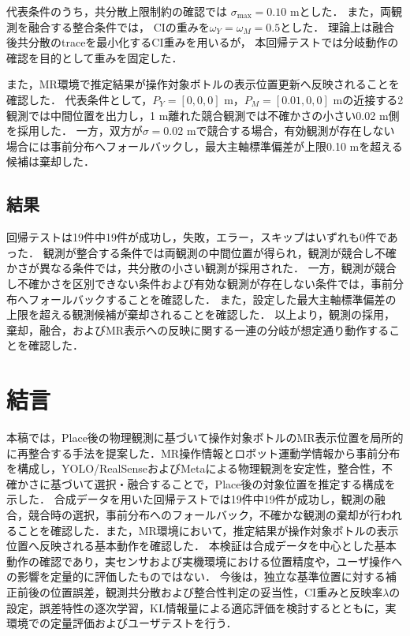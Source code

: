 \documentclass{sice-si}
\begin{document}
代表条件のうち，共分散上限制約の確認では
$\sigma_{\max}=0.10$ mとした．
また，両観測を融合する整合条件では，
CIの重みを$\omega_Y=\omega_M=0.5$とした．
理論上は融合後共分散のtraceを最小化するCI重みを用いるが，
本回帰テストでは分岐動作の確認を目的として重みを固定した．

また，MR環境で推定結果が操作対象ボトルの表示位置更新へ反映されることを確認した．
代表条件として，$P_Y=[0,0,0]$ m，$P_M=[0.01,0,0]$ mの近接する2観測では中間位置を出力し，1 m離れた競合観測では不確かさの小さい0.02 m側を採用した．
一方，双方が$\sigma=0.02$ mで競合する場合，有効観測が存在しない場合には事前分布へフォールバックし，最大主軸標準偏差が上限0.10 mを超える候補は棄却した．

\subsection{結果}
回帰テストは19件中19件が成功し，失敗，エラー，スキップはいずれも0件であった．
観測が整合する条件では両観測の中間位置が得られ，観測が競合し不確かさが異なる条件では，共分散の小さい観測が採用された．
一方，観測が競合し不確かさを区別できない条件および有効な観測が存在しない条件では，事前分布へフォールバックすることを確認した．
また，設定した最大主軸標準偏差の上限を超える観測候補が棄却されることを確認した．
以上より，観測の採用，棄却，融合，およびMR表示への反映に関する一連の分岐が想定通り動作することを確認した．

\vspace{4pt}
\section{結言}
本稿では，Place後の物理観測に基づいて操作対象ボトルのMR表示位置を局所的に再整合する手法を提案した．MR操作情報とロボット運動学情報から事前分布を構成し，YOLO/RealSenseおよびMetaによる物理観測を安定性，整合性，不確かさに基づいて選択・融合することで，Place後の対象位置を推定する構成を示した．
合成データを用いた回帰テストでは19件中19件が成功し，観測の融合，競合時の選択，事前分布へのフォールバック，不確かな観測の棄却が行われることを確認した．また，MR環境において，推定結果が操作対象ボトルの表示位置へ反映される基本動作を確認した．
本検証は合成データを中心とした基本動作の確認であり，実センサおよび実機環境における位置精度や，ユーザ操作への影響を定量的に評価したものではない．
今後は，独立な基準位置に対する補正前後の位置誤差，観測共分散および整合性判定の妥当性，CI重みと反映率$\lambda$の設定，誤差特性の逐次学習，KL情報量による適応評価を検討するとともに，実環境での定量評価およびユーザテストを行う．

\vspace{4pt}
\printbibliography[title=参考文献]
\end{document}
